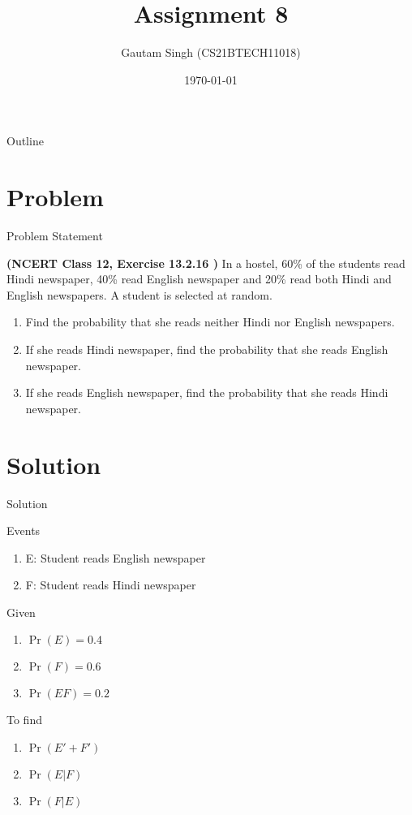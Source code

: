 \documentclass{beamer}
\title{Assignment 8}
\author{Gautam Singh (CS21BTECH11018)}
\date{\today}
\providecommand{\pr}[1]{\ensuremath{\Pr\left(#1\right)}}
\begin{document}
\begin{frame}
    \titlepage 
\end{frame}

\logo{}


\begin{frame}{Outline}
    \tableofcontents
\end{frame}


\section{Problem}
\begin{frame}{Problem Statement}

\textbf{(NCERT Class 12, Exercise 13.2.16 )} In a hostel, 60\% of the students read Hindi newspaper, 40\% read English newspaper and 20\% read both Hindi and English newspapers. A student is selected at random.

\begin{enumerate}[label=(\alph{enumi})]
	\item Find the probability that she reads neither Hindi nor English newspapers.
	\item If she reads Hindi newspaper, find the probability that she reads English newspaper.
	\item If she reads English newspaper, find the probability that she reads Hindi newspaper.
\end{enumerate}

\end{frame}


\section{Solution}
\begin{frame}{Solution}
    \begin{block}{Events}
        \begin{enumerate}
        		\item E: Student reads English newspaper
        		\item F: Student reads Hindi newspaper
        \end{enumerate}
    \end{block}
    \begin{block}{Given}
		\begin{enumerate}
			\item $\pr{E} = 0.4$
			\item $\pr{F} = 0.6$
			\item $\pr{EF} = 0.2$
			\label{given}	
		\end{enumerate}		    
    \end{block}
    \begin{alertblock}{To find}
    		\begin{enumerate}
    			\item $\pr{E' + F'}$
    			\item $\pr{E|F}$
    			\item $\pr{F|E}$
    		\end{enumerate}
    \end{alertblock}
\end{frame} 
\end{document}
